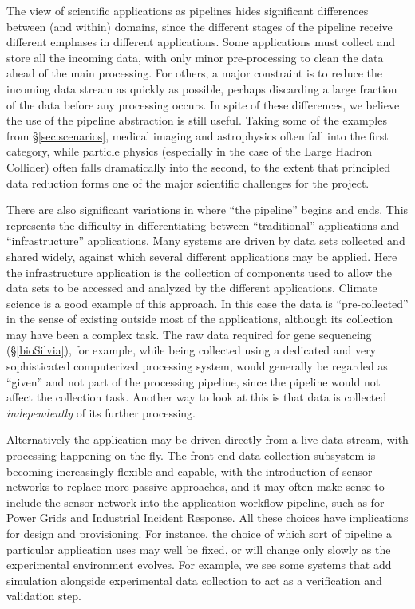 The view of scientific applications as pipelines hides significant
differences between (and within) domains, since the different stages
of the pipeline receive different emphases in different
applications. Some applications must collect and store all the
incoming data, with only minor pre-processing to clean the data ahead
of the main processing. For others, a major constraint is to reduce
the incoming data stream as quickly as possible, perhaps discarding a
large fraction of the data before any processing occurs. In spite of these differences, we believe the use of the pipeline abstraction is still useful.
Taking some of the examples from
\S\ref{sec:scenarios}, medical imaging and astrophysics often fall
into the first category, while particle physics (especially in the
case of the Large Hadron Collider) often falls dramatically into the
second, to the extent that principled data reduction forms one of the
major scientific challenges for the project.

There are also significant variations in where ``the pipeline'' begins
and ends. This represents the difficulty in differentiating between ``traditional'' applications 
and ``infrastructure'' applications. Many systems are driven by data sets collected and shared
widely, against which several different applications may be applied. 
Here the infrastructure application is the collection of components used to allow the 
data sets to be accessed and analyzed by the different applications. 
Climate science is a good example of this approach. In this
case the data is ``pre-collected'' in the sense of existing outside
most of the applications, although its collection may have been a
complex task. The raw data required for gene sequencing
(\S\ref{bioSilvia}), for example, while being collected using a
dedicated and very sophisticated computerized processing system, would
generally be regarded as ``given'' and not part of the processing
pipeline, since the pipeline would not affect the collection
task. Another way to look at this is that data is collected
\emph{independently} of its further processing.

Alternatively the application may be driven directly
from a live data stream, with processing happening on the
fly. The front-end data collection subsystem is becoming increasingly
flexible and capable, with the introduction of sensor networks to
replace more passive approaches, and it may often make sense to
include the sensor network into the application workflow pipeline, such as for Power Grids and
Industrial Incident Response. All
these choices have implications for design and provisioning. For instance,
the choice of which sort of pipeline a particular application uses may
well be fixed, or will change only slowly as the experimental
environment evolves. For example, we see some systems that add simulation alongside experimental data collection to act
as a verification and validation step.

